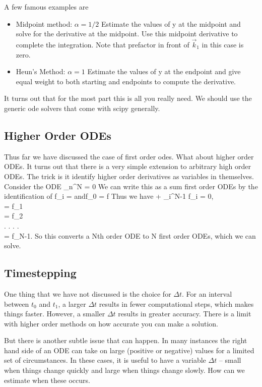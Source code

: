 A few famous examples are 
\begin{itemize}
    \item Midpoint method: $\alpha = 1/2$ Estimate the values of y at the midpoint and solve for the derivative at the midpoint.  Use this midpoint derivative to complete the integration.  Note that prefactor in front of $\vec{k}_1$ in this case is zero.
    \item Heun's Method: $\alpha = 1$ Estimate the values of y at the endpoint and give equal weight to both starting and endpoints to compute the derivative.
\end{itemize}

It turns out that for the most part this is all you really need.  We should use the generic ode solvers that come with scipy generally. 

\subsection{Higher Order ODEs}

Thus far we have discussed the case of first order odes.  What about higher order ODEs.  It turns out that there is a very simple extension to arbitrary high order ODEs.  The trick is it identify higher order derivatives as variables in themselves.  Consider the ODE
\be
\sum_n^N = 0
\ee
We can write this as a sum first order ODEs by the identification of 
\be
f_i =  \qquad\textrm{and}\qquad f_0 = f
\ee
Thus we have 
\be
{} + \sum_i^{N-1} f_i = 0,\\
 = f_1\\
 = f_2\\
 . . . . \\
 = f_{N-1}.
\ee
So this converts a Nth order ODE to N first order ODEs, which we can solve.

\subsection{Timestepping}

One thing that we have not discussed is the choice for $\Delta t$.  For an interval between $t_0$ and $t_1$, a larger $\Delta t$ results in fewer computational steps, which makes things faster.  However, a smaller $\Delta t$ results in greater accuracy.  There is a limit with higher order methods on how accurate you can make a solution.  

But there is another subtle issue that can happen.  In many instances the right hand side of an ODE can take on large (positive or negative) values for a limited set of circumstances.  In these cases, it is useful to have a variable $\Delta t$ -- small when things change quickly and large when things change slowly.  How can we estimate when these occurs.  


